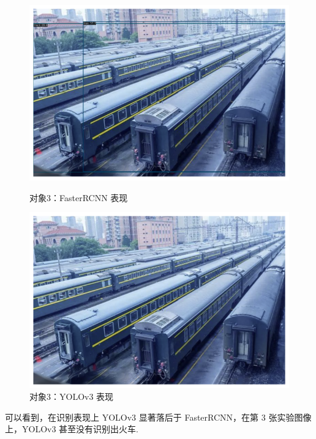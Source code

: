 \documentclass[notitlepage,cs4size,punct,oneside]{ctexrep}
\numberwithin{equation}{chapter}
\theoremstyle{mystyle}
\begin{document}
\begin{figure}[!htpb]
    \centering
    \begin{minipage}[t]{0.49\textwidth}
    \includegraphics[width=\linewidth]{cnntest3.png}
    \caption{对象3：FasterRCNN 表现}
    \label{mAPfrcnn}
    \end{minipage}
    \begin{minipage}[t]{0.49\textwidth}
    \includegraphics[width=\linewidth]{yolotest3.png}
    \caption{对象3：YOLOv3 表现}
    \label{frcnn_loss}
    \end{minipage}
\end{figure}

可以看到，在识别表现上 YOLOv3 显著落后于 FasterRCNN，在第 3 张实验图像上，YOLOv3 甚至没有识别出火车.
\end{document}

